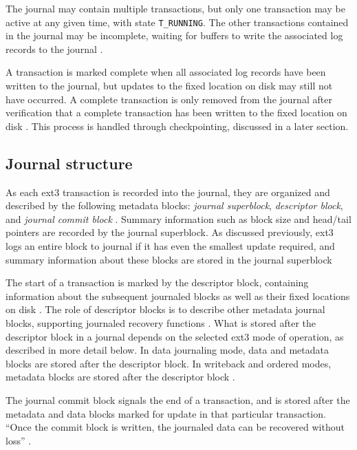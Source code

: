 The journal may contain multiple transactions, but only one transaction may be active at any given time, with state \texttt{T_RUNNING}. The other transactions contained in the journal may be incomplete, waiting for buffers to write the associated log records to the journal \citep{Bovet2006}.

A transaction is marked complete when all associated log records have been written to the journal, but updates to the fixed location on disk may still not have occurred. A complete transaction is only removed from the journal after verification that a complete transaction has been written to the fixed location on disk \citep{Bovet2006}. This process is handled through checkpointing, discussed in a later section.

\subsection{Journal structure}

As each ext3 transaction is recorded into the journal, they are organized and described by the following metadata blocks: \emph{journal superblock}, \emph{descriptor block}, and \emph{journal commit block} \citep{Prabhakaran2005a}. Summary information such as block size and head/tail pointers are recorded by the journal superblock. As discussed previously, ext3 logs an entire block to journal if it has even the smallest update required, and summary information about these blocks are stored in the journal superblock \citep{Prabhakaran2005a, Galli2001}

The start of a transaction is marked by the descriptor block, containing information about the subsequent journaled blocks as well as their fixed locations on disk \citep{Prabhakaran2005a}. The role of descriptor blocks is to describe other metadata journal blocks, supporting journaled recovery functions \citep{Galli2001, Tweedie1998}. What is stored after the descriptor block in a journal depends on the selected ext3 mode of operation, as described in more detail below. In data journaling mode, data and metadata blocks are stored after the descriptor block. In writeback and ordered modes, metadata blocks are stored after the descriptor block \citep{Prabhakaran2005a}.

The journal commit block signals the end of a transaction, and is stored after the metadata and data blocks marked for update in that particular transaction. ``Once the commit block is written, the journaled data can be recovered without loss'' \citep[p. 109]{Prabhakaran2005a}.

